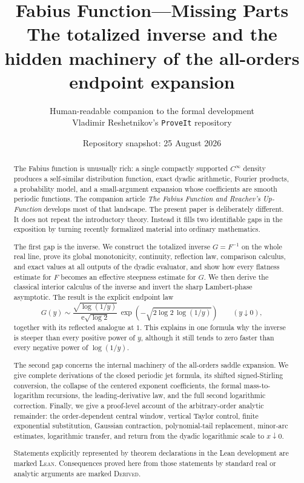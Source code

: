 \documentclass[11pt,oneside]{article}
\title{\bfseries Fabius Function---Missing Parts\\[0.35em]
\large The totalized inverse and the hidden machinery of the all-orders endpoint expansion}
\author{Human-readable companion to the formal development\\
\small Vladimir Reshetnikov's \texttt{ProveIt} repository}
\date{Repository snapshot: 25 August 2026}
\theoremstyle{definition}
\theoremstyle{remark}
\newcommand{\e}{\mathrm e}
\newcommand{\InvF}{G}
\newcommand{\Formalized}{\textsc{Lean}}
\newcommand{\Derived}{\textsc{Derived}}
\begin{document}
\maketitle

\begin{abstract}
The Fabius function is unusually rich: a single compactly supported
$C^\infty$ density produces a self-similar distribution function, exact
dyadic arithmetic, Fourier products, a probability model, and a
small-argument expansion whose coefficients are smooth periodic functions.
The companion article \emph{The Fabius Function and Rvachev's Up-Function}
develops most of that landscape.  The present paper is deliberately
different.  It does not repeat the introductory theory.  Instead it fills
two identifiable gaps in the exposition by turning recently formalized
material into ordinary mathematics.

The first gap is the inverse.  We construct the totalized inverse
$\InvF=F^{-1}$ on the whole real line, prove its global monotonicity,
continuity, reflection law, comparison calculus, and exact values at all
outputs of the dyadic evaluator, and show how every flatness estimate for
$F$ becomes an effective steepness estimate for $\InvF$.  We then derive
the classical interior calculus of the inverse and invert the sharp
Lambert-phase asymptotic.  The result is the explicit endpoint law
\[
 \InvF(y)\sim
 \frac{\sqrt{\log(1/y)}}{\e\sqrt{\log 2}}\,
 \exp\!\left(-\sqrt{2\log 2\,\log(1/y)}\right)
 \qquad (y\downarrow0),
\]
together with its reflected analogue at $1$.  This explains in one formula
why the inverse is steeper than every positive power of $y$, although it
still tends to zero faster than every negative power of $\log(1/y)$.

The second gap concerns the internal machinery of the all-orders saddle
expansion.  We give complete derivations of the closed periodic jet
formula, its shifted signed-Stirling conversion, the collapse of the
centered exponent coefficients, the formal mass-to-logarithm recursions,
the leading-derivative law, and the full second logarithmic correction.
Finally, we give a proof-level account of the arbitrary-order analytic
remainder: the order-dependent central window, vertical Taylor control,
finite exponential substitution, Gaussian contraction, polynomial-tail
replacement, minor-arc estimates, logarithmic transfer, and return from
the dyadic logarithmic scale to $x\downarrow0$.

Statements explicitly represented by theorem declarations in the Lean
development are marked \Formalized.  Consequences proved here from those
statements by standard real or analytic arguments are marked \Derived.
\end{abstract}
\end{document}
